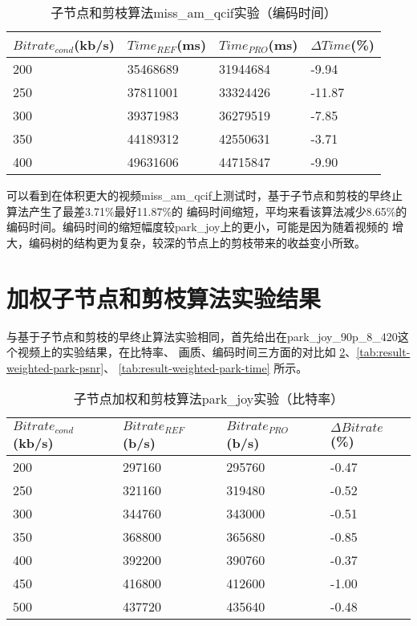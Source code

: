 \begin{table}[H]
  \centering
    \caption{子节点和剪枝算法miss\_am\_qcif实验（编码时间）}
    \label{tab:result-sum-miss-time}
    \begin{tabularx}{\linewidth}{XXXX}
      \toprule[1.5pt]
      $Bitrate_{cond}$(kb/s) & $Time_{REF}$(ms) & $Time_{PRO}$(ms) & $\Delta Time$(\%) \\
      \midrule[1pt]
      200 & 35468689 & 31944684 & -9.94 \\
      250 & 37811001 & 33324426 & -11.87 \\
      300 & 39371983 & 36279519 & -7.85 \\
      350 & 44189312 & 42550631 & -3.71 \\
      400 & 49631606 & 44715847 & -9.90 \\
      \bottomrule[1.5pt]
    \end{tabularx}
\end{table}

可以看到在体积更大的视频miss\_am\_qcif上测试时，基于子节点和剪枝的早终止算法产生了最差3.71\%最好11.87\%的
编码时间缩短，平均来看该算法减少8.65\%的编码时间。编码时间的缩短幅度较park\_joy上的更小，可能是因为随着视频的
增大，编码树的结构更为复杂，较深的节点上的剪枝带来的收益变小所致。


\section{加权子节点和剪枝算法实验结果}

与基于子节点和剪枝的早终止算法实验相同，首先给出在park\_joy\_90p\_8\_420这个视频上的实验结果，在比特率、
画质、编码时间三方面的对比如 \ref{tab:result-weighted-park-bitrate}、\ref{tab:result-weighted-park-psnr}、
\ref{tab:result-weighted-park-time} 所示。

\begin{table}[H]
  \caption{子节点加权和剪枝算法park\_joy实验（比特率）}
    \label{tab:result-weighted-park-bitrate}
    \begin{tabularx}{\linewidth}{XXXX}
      \toprule[1.5pt]
      $Bitrate_{cond}$(kb/s) & $Bitrate_{REF}$(b/s) & $Bitrate_{PRO}$(b/s) & $\Delta Bitrate$(\%) \\
      \midrule[1pt]
      200 & 297160 & 295760 & -0.47  \\
      250 & 321160 & 319480 & -0.52 \\
      300 & 344760 & 343000 & -0.51  \\
      350 & 368800 & 365680 & -0.85 \\
      400 & 392200 & 390760 & -0.37  \\
      450 & 416800 & 412600 & -1.00 \\
      500 & 437720 & 435640 & -0.48  \\
      \bottomrule[1.5pt]
    \end{tabularx}
\end{table}

